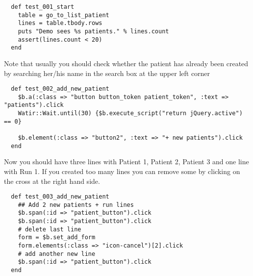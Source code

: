 \begin{verbatim}
  def test_001_start
    table = go_to_list_patient
    lines = table.tbody.rows
    puts "Demo sees %s patients." % lines.count
    assert(lines.count < 20)
  end

\end{verbatim}

Note that usually you should check whether the patient has
already been created by searching her/his name in the search box at the
upper left corner

\begin{verbatim}
  def test_002_add_new_patient
    $b.a(:class => "button button_token patient_token", :text => "patients").click
    Watir::Wait.until(30) {$b.execute_script("return jQuery.active") == 0}

    $b.element(:class => "button2", :text => "+ new patients").click
  end

\end{verbatim}

  Now you should have three lines with Patient 1, Patient 2, Patient 3 and one
  line with Run 1.
  If you created too many lines you can remove some by clicking on the cross at
  the right hand side.

\begin{verbatim}
  def test_003_add_new_patient
    ## Add 2 new patients + run lines
    $b.span(:id => "patient_button").click
    $b.span(:id => "patient_button").click
    # delete last line
    form = $b.set_add_form
    form.elements(:class => "icon-cancel")[2].click
    # add another new line
    $b.span(:id => "patient_button").click
  end

\end{verbatim}

